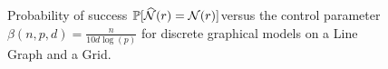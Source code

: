 \begin{figure}[t]
\centering
{}
\label{fig:neighborhoodrecovery}
\caption{Probability of success \small$\mathbb{P}[\widehat{\N}(\svert) = \N(\svert)]$\normalsize versus the control parameter $\beta(n, p, d) = \frac{n}{10 d \log(p)}$ for discrete graphical models on a Line Graph and a Grid.}
 
\end{figure}

